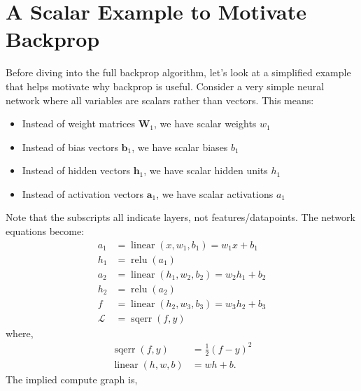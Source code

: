 \documentclass{article}
\newcommand{\h}{\mathbf{h}}
\newcommand{\bv}{\mathbf{b}}
\renewcommand{\a}{\mathbf{a}}
\newcommand{\W}{\mathbf{W}}
\renewcommand{\L}{\mathcal{L}}
\newcommand{\linear}{\operatorname{linear}}
\newcommand{\relu}{\operatorname{relu}}
\newcommand{\sqerr}{\operatorname{sqerr}}
\begin{document}
\section{A Scalar Example to Motivate Backprop}
Before diving into the full backprop algorithm, let's look at a simplified example that helps motivate why backprop is useful. Consider a very simple neural network where all variables are scalars rather than vectors. This means:
\begin{itemize}
\item Instead of weight matrices $\W_1$, we have scalar weights $w_1$
\item Instead of bias vectors $\bv_1$, we have scalar biases $b_1$
\item Instead of hidden vectors $\h_1$, we have scalar hidden units $h_1$
\item Instead of activation vectors $\a_1$, we have scalar activations $a_1$
\end{itemize}
Note that the subscripts all indicate layers, not features/datapoints.
The network equations become:
\begin{subequations}
\begin{align}
a_1 &= \linear(x, w_1, b_1) = w_1 x + b_1\\
h_1 &= \relu(a_1)\\
a_2 &= \linear(h_1, w_2, b_2) = w_2 h_1 + b_2\\
h_2 &= \relu(a_2)\\
f &= \linear(h_2, w_3, b_3) = w_3 h_2 + b_3\\
\L &= \sqerr(f, y)
\end{align}
\end{subequations}
where,
\begin{align}
  \sqerr(f, y) &= \tfrac{1}{2} (f - y)^2\\
  \linear(h, w, b) &= w h + b.
\end{align}
The implied compute graph is,
\end{document}
